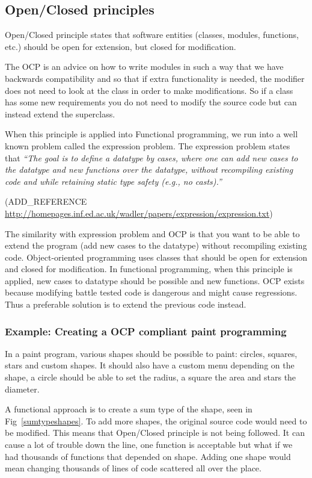 \subsection{Open/Closed principles}

Open/Closed principle states that software entities (classes, modules,
functions, etc.) should be open for extension, but closed for modification.

The OCP is an advice on how to write modules in such a way that we have
backwards compatibility and so that if extra functionality is needed, the
modifier does not need to look at the class in order to make modifications. So
if a class has some new requirements you do not need to modify the source code
but can instead extend the superclass.

When this principle is applied into Functional programming, we run into a well
known problem called the expression problem. The expression problem states that
\textit{``The goal is to define a datatype by cases, where one can add new
cases to the datatype and new functions over the datatype, without recompiling
existing code and while retaining static type safety (e.g., no casts).''}

(ADD\_REFERENCE \url{http://homepages.inf.ed.ac.uk/wadler/papers/expression/expression.txt})

The similarity with expression problem and OCP is that you want to be able to
extend the program (add new cases to the datatype) without recompiling existing
code.  Object-oriented programming uses classes that should be open for
extension and closed for modification. In functional programming, when this
principle is applied, new cases to datatype should be possible and new
functions.  OCP exists because modifying battle tested code is dangerous and
might cause regressions. Thus a preferable solution is to extend the previous
code instead.

\subsubsection{Example: Creating a OCP compliant paint programming}

In a paint program, various shapes should be possible to paint: circles,
squares, stars and custom shapes. It should also have a custom menu depending on
the shape, a circle should be able to set the radius, a square the area and
stars the diameter.

A functional approach is to create a sum type of the shape, seen in
Fig~\ref{sumtypeshapes}.  To add more shapes, the original source code would
need to be modified.  This means that Open/Closed principle is not being
followed. It can cause a lot of trouble down the line, one function is
acceptable but what if we had thousands of functions that depended on shape.
Adding one shape would mean changing thousands of lines of code scattered all
over the place.

